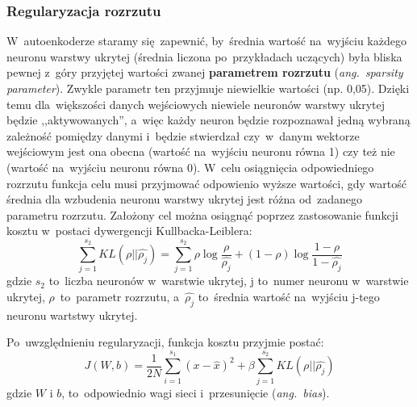 \subsubsection{Regularyzacja rozrzutu}
W~autoenkoderze staramy się~zapewnić, by~średnia wartość na~wyjściu każdego neuronu warstwy ukrytej
(średnia liczona po~przykładach uczących) była bliska pewnej z~góry przyjętej wartości zwanej \textbf{parametrem
rozrzutu} (\textit{ang.~sparsity parameter}). Zwykle parametr ten przyjmuje niewielkie wartości (np. 0,05). Dzięki temu
dla~większości danych wejściowych niewiele neuronów warstwy ukrytej będzie ,,aktywowanych'', a~więc każdy neuron będzie
rozpoznawał jedną wybraną zależność pomiędzy danymi i~będzie stwierdzał czy~w~danym wektorze wejściowym jest ona obecna
(wartość na~wyjściu neuronu równa 1) czy też nie (wartość na~wyjściu neuronu równa 0). W~celu osiągnięcia odpowiedniego
rozrzutu funkcja celu musi przyjmować odpowienio wyższe wartości, gdy wartość średnia dla wzbudenia neuronu warstwy
ukrytej jest różna od~zadanego parametru rozrzutu. Założony cel można osiągnąć poprzez zastosowanie funkcji kosztu
w~postaci dywergencji Kullbacka-Leiblera:
\begin{equation*}
\sum\limits_{j=1}^{s_2}KL(\rho||\hat{\rho_j}) = \sum\limits_{j=1}^{s_2}\rho \log\frac{\rho}{\hat{\rho_j}} +
(1-\rho)\log\frac{1-\rho}{1-\hat{\rho_j}}
\end{equation*}
gdzie $s_2$ to~liczba neuronów w~warstwie ukrytej, j to~numer neuronu w~warstwie ukrytej, $\rho$~to~parametr rozrzutu,
a~$\hat{\rho_j}$ to~średnia wartość na~wyjściu j-tego neuronu wartstwy ukrytej.

Po~uwzględnieniu regularyzacji, funkcja kosztu przyjmie postać:
\begin{equation*}
J(W,b)=\frac{1}{2N}\sum\limits_{i=1}^{s_1}(x-\hat{x})^2 + \beta\sum\limits_{j=1}^{s_2}KL(\rho||\hat{\rho_j})
\end{equation*}
gdzie $W$ i $b$, to~odpowiednio wagi sieci i~przesunięcie (\textit{ang.~bias}).

